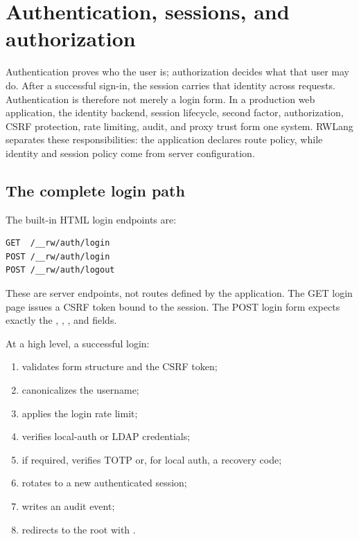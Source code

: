 \chapter{Authentication, sessions, and authorization}

Authentication proves who the user is; authorization decides what that user may do. After a successful sign-in, the session carries that identity across requests. Authentication is therefore not merely a login form. In a production web application, the identity backend, session lifecycle, second factor, authorization, CSRF protection, rate limiting, audit, and proxy trust form one system. RWLang separates these responsibilities: the  application declares route policy, while identity and session policy come from server configuration.

\section{The complete login path}

The built-in HTML login endpoints are:

\begin{lstlisting}
GET  /__rw/auth/login
POST /__rw/auth/login
POST /__rw/auth/logout
\end{lstlisting}

These are server endpoints, not routes defined by the application. The GET login page issues a CSRF token bound to the session. The POST login form expects exactly the , , , and  fields.

At a high level, a successful login:

\begin{enumerate}
  \item validates form structure and the CSRF token;
  \item canonicalizes the username;
  \item applies the login rate limit;
  \item verifies local-auth or LDAP credentials;
  \item if required, verifies TOTP or, for local auth, a recovery code;
  \item rotates to a new authenticated session;
  \item writes an audit event;
  \item redirects to the root with .
\end{enumerate}

